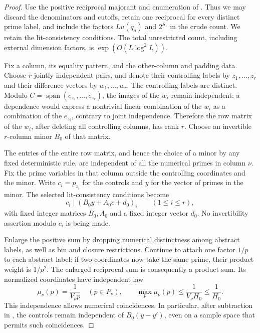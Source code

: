 \begin{proof}
Use the positive reciprocal majorant and enumeration of
.  Thus we may discard the denominators and
cutoffs, retain one reciprocal for every distinct prime label, and
include the factors $Lu(q_a)$ and $2^{S_1}$ in the crude count.  We
retain the lit-consistency conditions.  The total unrestricted count,
including external dimension factors, is
$\exp(O(L\log^2L))$.

Fix a column, its equality pattern, and the other-column and padding
data.  Choose $r$ jointly independent pairs, and denote their
controlling labels by $z_1,\ldots,z_r$ and their difference vectors
by $w_1,\ldots,w_r$.  The controlling labels are distinct.  Modulo
$C=\operatorname{span}(e_{z_1},\ldots,e_{z_r})$, the images of the
$w_i$ remain independent: a dependence would express a nontrivial
linear combination of the $w_i$ as a combination of the $e_{z_i}$,
contrary to joint independence.  Therefore the row matrix of the
$w_i$, after deleting all controlling columns, has rank $r$.
Choose an invertible $r$-column minor $B_0$ of that matrix.

The entries of the entire row matrix, and hence the choice of a
minor by any fixed deterministic rule, are independent of all the
numerical primes in column $\nu$.  Fix the prime variables in that
column outside the controlling coordinates and the minor.  Write
$c_i=p_{z_i}$ for the controls and $y$ for the vector of primes in
the minor.  The selected lit-consistency conditions become
\begin{equation}\label{q:rank-congruences}
 c_i\mid (B_0y+A_0c+d_0)_i\qquad(1\le i\le r),
\end{equation}
with fixed integer matrices $B_0,A_0$ and a fixed integer vector
$d_0$.  No invertibility assertion modulo $c_i$ is being made.

Enlarge the positive sum by dropping numerical distinctness among
abstract labels, as well as bin and closure restrictions.  Continue
to attach one factor $1/p$ to each abstract label: if two coordinates
now take the same prime, their product weight is $1/p^2$.
The enlarged reciprocal sum is consequently a product sum.  Its
normalized coordinates have independent law
\[
 \mu_\nu(p)=\frac{1}{V_\nu p}\quad(p\in P_\nu),
 \qquad \max_p\mu_\nu(p)\le\frac{1}{V_\nu H_0}
 \le\frac1{H_0}.
\]
This independence allows numerical coincidences.  In particular, after
subtraction in , the controls remain
independent of $B_0(y-y')$, even on a sample space that permits such
coincidences.


\end{proof}
